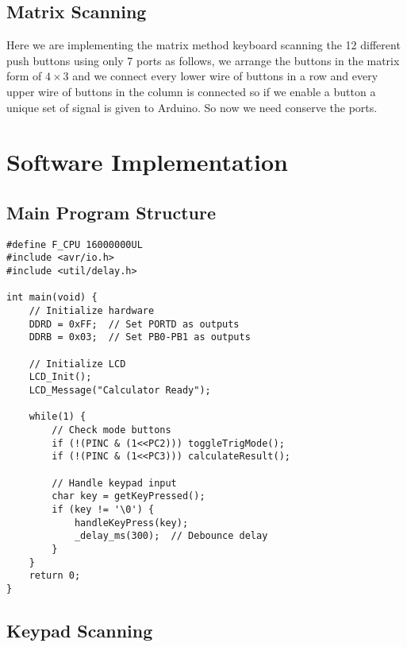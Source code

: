 \documentclass{article}
\begin{document}
\subsection{Matrix Scanning}
Here we are implementing the matrix method keyboard scanning the 12 different push buttons using only 7 ports as follows, we arrange the buttons in the matrix form of $4\times3$ and we connect every lower wire of buttons in a row and every upper wire of buttons in the column is connected so if we enable a button a unique set of signal is given to Arduino. So now we need conserve the ports.
\section{Software Implementation}

\subsection{Main Program Structure}

\begin{lstlisting}[caption=Main Program Loop, label=lst:main]
#define F_CPU 16000000UL
#include <avr/io.h>
#include <util/delay.h>

int main(void) {
    // Initialize hardware
    DDRD = 0xFF;  // Set PORTD as outputs
    DDRB = 0x03;  // Set PB0-PB1 as outputs
    
    // Initialize LCD
    LCD_Init();
    LCD_Message("Calculator Ready");
    
    while(1) {
        // Check mode buttons
        if (!(PINC & (1<<PC2))) toggleTrigMode();
        if (!(PINC & (1<<PC3))) calculateResult();
        
        // Handle keypad input
        char key = getKeyPressed();
        if (key != '\0') {
            handleKeyPress(key);
            _delay_ms(300);  // Debounce delay
        }
    }
    return 0;
}
\end{lstlisting}

\subsection{Keypad Scanning}
\end{document}
